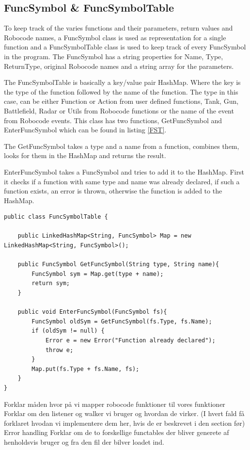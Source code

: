 \subsection{FuncSymbol \& FuncSymbolTable}
To keep track of the varies functions and their parameters, return values and Robocode names, a FuncSymbol class is used as representation for a single function and a FuncSymbolTable class is used to keep track of every FuncSymbol in the program.
The FuncSymbol has a string properties for Name, Type, ReturnType, original Robocode names and a string array for the parameters.

The FuncSymbolTable is basically a key/value pair HashMap. Where the key is the type of the function followed by the name of the function. The type in this case, can be either Function or Action from user defined functions, Tank, Gun, Battlefield, Radar or Utils from Robocode functions or the name of the event from Robocode events.
This class has two functions, GetFuncSymbol and EnterFuncSymbol which can be found in listing \ref{FST}. 

The GetFuncSymbol takes a type and a name from a function, combines them, looks for them in the HashMap and returns the result.

EnterFuncSymbol takes a FuncSymbol and tries to add it to the HashMap. First it checks if a function with same type and name was already declared, if such a function exists, an error is thrown, otherwise the function is added to the HashMap.

\begin{lstlisting}[caption={FuncSymbolTable}, label={FST}]
public class FuncSymbolTable {

	public LinkedHashMap<String, FuncSymbol> Map = new LinkedHashMap<String, FuncSymbol>();

	public FuncSymbol GetFuncSymbol(String type, String name){
    	FuncSymbol sym = Map.get(type + name);
    	return sym;
	}

	public void EnterFuncSymbol(FuncSymbol fs){
    	FuncSymbol oldSym = GetFuncSymbol(fs.Type, fs.Name);
    	if (oldSym != null) {
        	Error e = new Error("Function already declared");
        	throw e;
    	}
    	Map.put(fs.Type + fs.Name, fs);
	}
}
\end{lstlisting}

Forklar måden hvor på vi mapper robocode funktioner til vores funktioner
Forklar om den listener og walker vi bruger og hvordan de virker. (I hvert fald  få forklaret hvodan vi implementere dem her, hvis de er beskrevet  i den section før)
Error handling
Forklar om de to forskellige functables der bliver generete af henholdsvis bruger og fra den fil der bilver loadet ind. 

